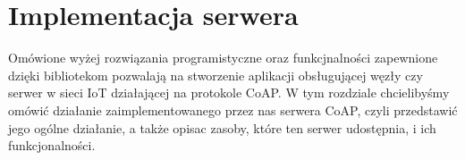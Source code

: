 \section{Implementacja serwera}

Omówione wyżej rozwiązania programistyczne oraz funkcjnalności zapewnione dzięki bibliotekom pozwalają na stworzenie aplikacji obsługującej węzły czy serwer w sieci IoT działającej na protokole CoAP. W tym rozdziale chcielibyśmy omówić działanie zaimplementowanego przez nas serwera CoAP, czyli przedstawić jego ogólne działanie, a także opisac zasoby, które ten serwer udostępnia, i ich funkcjonalności.



